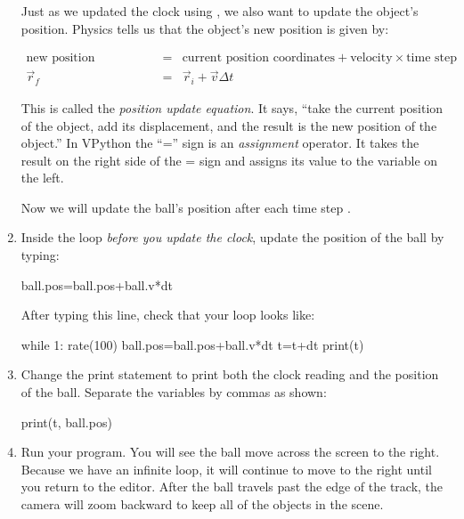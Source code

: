 \begin{enumerate}

Just as we updated the clock using , we also want to update the object's position. Physics tells us that the object's new position is given by:

\begin{eqnarray*}
	\mbox{new position coordinates} & = &  \mbox{current position coordinates} + \mbox{velocity} \times \mbox{time step} \\
	\vec{r}_f & = & \vec{r}_i + \vec{v}\Delta t 
\end{eqnarray*}

This is called the \emph{position update equation}. It says, ``take the current position of the object, add its displacement, and the result is the new position of the object.'' In VPython the ``='' sign is an \emph{assignment} operator. It takes the result on the right side of the = sign and assigns its value to the variable on the left. 

Now we will update the ball's position after each time step .

\item Inside the  loop \emph{before you update the clock}, update the position of the ball by typing:

\begin{myvpython}
	ball.pos=ball.pos+ball.v*dt
\end{myvpython}

After typing this line, check that your  loop looks like:

\begin{myvpython}
while 1:
	rate(100)
	ball.pos=ball.pos+ball.v*dt
	t=t+dt
	print(t)
\end{myvpython}

\item Change the print statement to print both the clock reading and the position of the ball. Separate the variables by commas as shown:

\begin{myvpython}
	print(t, ball.pos)
\end{myvpython}

\item Run your program. You will see the ball move across the screen to the right. Because we have an infinite loop, it will continue to move to the right until you return to the editor. After the ball travels past the edge of the track, the camera will zoom backward to keep all of the objects in the scene.


\end{enumerate}
